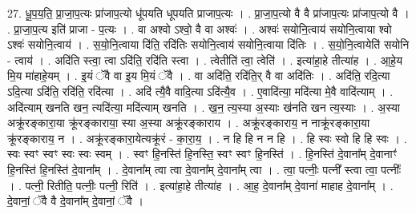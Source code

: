 \documentclass[17pt]{extarticle}
\begin{document}
27. धू॒प॒य॒ति॒ प्रा॒जा॒प॒त्यः प्रा॑जाप॒त्यो धू॑पयति धूपयति प्राजाप॒त्यः । . प्रा॒जा॒प॒त्यो वै वै प्रा॑जाप॒त्यः प्रा॑जाप॒त्यो वै । . प्रा॒जा॒प॒त्य इति॑ प्राजा - प॒त्यः । . वा अश्वो ऽश्वो॒ वै वा अश्वः॑ । . अश्वः॑ सयोनि॒त्वाय॑ सयोनि॒त्वाया श्वो ऽश्वः॑ सयोनि॒त्वाय॑ । . स॒यो॒नि॒त्वाया दि॑ति॒ रदि॑तिः सयोनि॒त्वाय॑ सयोनि॒त्वाया दि॑तिः । . स॒यो॒नि॒त्वायेति॑ सयोनि - त्वाय॑ । . अदि॑ति स्त्वा॒ त्वा ऽदि॑ति॒ रदि॑ति स्त्वा । . त्वेतीति॑ त्वा॒ त्वेति॑ । . इत्या॑हा॒हे तीत्या॑ह । . आ॒हे॒य मि॒य मा॑हाहे॒यम् । . इ॒यं ॅवै वा इ॒य मि॒यं ॅवै । . वा अदि॑ति॒ रदि॑ति॒र् वै वा अदि॑तिः । . अदि॑ति॒ रदि॒त्या ऽदि॒त्या ऽदि॑ति॒ रदि॑ति॒ रदि॑त्या । . अदि॑ त्यै॒वै वादि॒त्या ऽदि॑त्यै॒व । . ए॒वादि॑त्या॒ मदि॑त्या मे॒वै वादि॑त्याम् । . अदि॑त्याम् खनति खन॒ त्यदि॑त्या॒ मदि॑त्याम् खनति । . ख॒न॒ त्य॒स्या अ॒स्याः ख॑नति खन त्य॒स्याः । . अ॒स्या अक्रू॑रङ्कारा॒या क्रू॑रङ्काराया॒ स्या अ॒स्या अक्रू॑रङ्काराय । . अक्रू॑रङ्काराय॒ न नाक्रू॑रङ्कारा॒या क्रू॑रङ्काराय॒ न । . अक्रू॑रङ्कारा॒येत्यक्रू॑रं - का॒रा॒य॒ । . न हि हि न न हि । . हि स्वः स्वो हि हि स्वः । . स्वः स्वꣳ स्वꣳ स्वः स्वः स्वम् । . स्वꣳ हि॒नस्ति॑ हि॒नस्ति॒ स्वꣳ स्वꣳ हि॒नस्ति॑ । . हि॒नस्ति॑ दे॒वाना᳚म् दे॒वानाꣳ॑ हि॒नस्ति॑ हि॒नस्ति॑ दे॒वाना᳚म् । . दे॒वाना᳚म् त्वा त्वा दे॒वाना᳚म् दे॒वाना᳚म् त्वा । . त्वा॒ पत्नीः॒ पत्नी᳚ स्त्वा त्वा॒ पत्नीः᳚ । . पत्नी॒ रितीति॒ पत्नीः॒ पत्नी॒ रिति॑ । . इत्या॑हा॒हे तीत्या॑ह । . आ॒ह॒ दे॒वाना᳚म् दे॒वाना॑ माहाह दे॒वाना᳚म् । . दे॒वानां॒ ॅवै वै दे॒वाना᳚म् दे॒वानां॒ ॅवै । \newline
\end{document}
